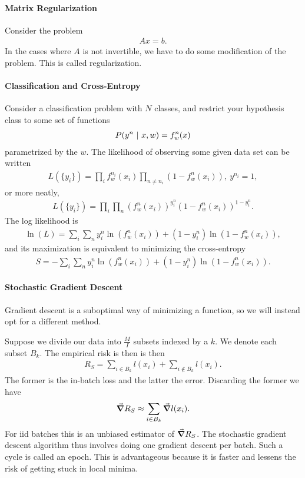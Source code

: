 \paragraph{Matrix Regularization}
Consider the problem
\begin{align*}
	Ax = b.
\end{align*}
In the cases where $A$ is not invertible, we have to do some modification of the problem. This is called regularization.

\paragraph{Classification and Cross-Entropy}
Consider a classification problem with $N$ classes, and restrict your hypothesis class to some set of functions
\begin{align*}
	P(y^{n}\ \vert\  x, w) = f_{w}^{n}(x)
\end{align*}
parametrized by the $w$. The likelihood of observing some given data set can be written
\begin{align*}
	L(\{y_{i}\}) = \prod\limits_{i}f_{w}^{n_{i}}(x_{i})\prod\limits_{n \neq n_{i}}(1 - f_{w}^{n}(x_{i})),\ y^{n_{i}} = 1,
\end{align*}
or more neatly,
\begin{align*}
	L(\{y_{i}\}) = \prod\limits_{i}\prod\limits_{n}(f_{w}^{n}(x_{i}))^{y_{i}^{n}}(1 - f_{w}^{n}(x_{i}))^{1 - y_{i}^{n}}.
\end{align*}
The log likelihood is
\begin{align*}
	\ln(L) = \sum\limits_{i}\sum\limits_{n}y_{i}^{n}\ln(f_{w}^{n}(x_{i})) + (1 - y_{i}^{n})\ln(1 - f_{w}^{n}(x_{i})),
\end{align*}
and its maximization is equivalent to minimizing the cross-entropy
\begin{align*}
	S = -\sum\limits_{i}\sum\limits_{n}y_{i}^{n}\ln(f_{w}^{n}(x_{i})) + (1 - y_{i}^{n})\ln(1 - f_{w}^{n}(x_{i})).
\end{align*}

\paragraph{Stochastic Gradient Descent}
Gradient descent is a suboptimal way of minimizing a function, so we will instead opt for a different method.

Suppose we divide our data into $\frac{M}{I}$ subsets indexed by a $k$. We denote each subset $B_{k}$. The empirical risk is then is then
\begin{align*}
	R_{S} = \sum\limits_{i\in B_{k}}l(x_{i}) + \sum\limits_{i\notin B_{k}}l(x_{i}).
\end{align*}
The former is the in-batch loss and the latter the error. Discarding the former we have
\begin{align*}
	\grad R_{S} \approx \sum\limits_{i\in B_{k}}\grad l(x_{i}).
\end{align*}
For iid batches this is an unbiased estimator of $\grad R_{S}$. The stochastic gradient descent algorithm thus involves doing one gradient descent per batch. Such a cycle is called an epoch. This is advantageous because it is faster and lessens the risk of getting stuck in local minima.

